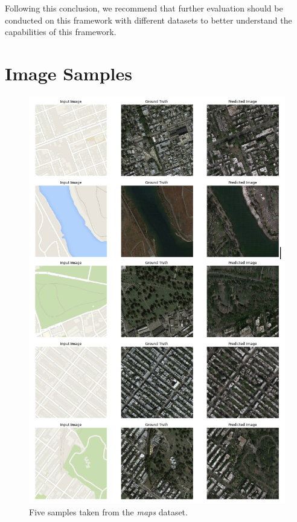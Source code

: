 \documentclass[peerreview]{IEEEtran}
\begin{document}
Following this conclusion, we recommend that further evaluation should be conducted on this framework with different datasets to better understand the capabilities of this framework.

\printbibliography


\appendices
\section{Image Samples} 
\begin{figure}[ht]
\centering
\includegraphics[width=0.6\columnwidth]{ex_maps.png} 
\caption{Five samples taken from the \textit{maps} dataset.}
\label{fig:ex_maps}
\end{figure}
\end{document}
